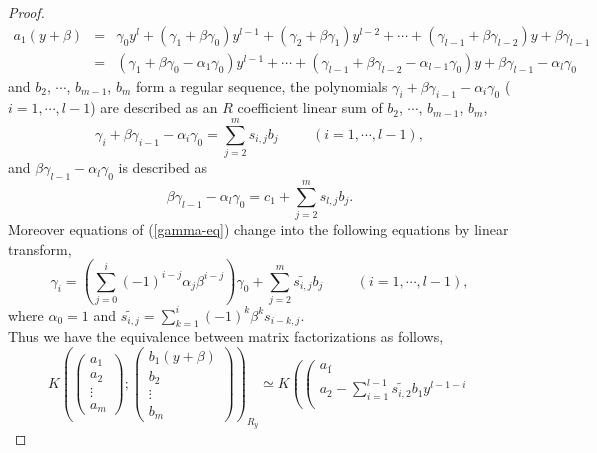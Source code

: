 \documentclass[10pt]{amsart}
\theoremstyle{break}
\begin{document}
\begin{proof}
\begin{eqnarray*}
a_1(y+\beta)&=&\gamma_{0}y^{l}+(\gamma_{1}+\beta\gamma_{0})y^{l-1}+(\gamma_{2}+\beta\gamma_{1})y^{l-2}+\cdots +(\gamma_{l-1}+\beta\gamma_{l-2})y+\beta\gamma_{l-1}\\[-0.1em]
&=&(\gamma_{1}+\beta\gamma_{0}-\alpha_1\gamma_{0})y^{l-1}+\cdots +(\gamma_{l-1}+\beta\gamma_{l-2}-\alpha_{l-1}\gamma_{0})y+\beta\gamma_{l-1}-\alpha_l\gamma_{0}
\end{eqnarray*}
and $b_2$, $\cdots$, $b_{m-1}$, $b_{m}$ form a regular sequence, the polynomials $\gamma_{i}+\beta\gamma_{i-1}-\alpha_{i}\gamma_{0}$ ($i=1,\cdots ,l-1$) are described as an $R$ coefficient linear sum of $b_2$, $\cdots$, $b_{m-1}$, $b_m$,
\begin{equation}\label{gamma-eq}
\gamma_{i}+\beta\gamma_{i-1}-\alpha_{i}\gamma_{0}=\sum_{j=2}^{m}s_{i,j}b_j \hspace{1cm}(i=1,\cdots ,l-1),
\end{equation}
and $\beta\gamma_{l-1}-\alpha_l\gamma_{0}$ is described as
\begin{equation*}
\beta\gamma_{l-1}-\alpha_l\gamma_{0}=c_1+\sum_{j=2}^{m}s_{l,j}b_j.
\end{equation*}
Moreover equations of (\ref{gamma-eq}) change into the following equations by linear transform,
\begin{equation*}
\gamma_i=(\sum_{j=0}^{i}(-1)^{i-j}\alpha_j\beta^{i-j})\gamma_0+\sum_{j=2}^{m}\widetilde{s_{i,j}}b_j\hspace{1cm}(i=1,\cdots ,l-1),
\end{equation*}
where $\alpha_0=1$ and $\displaystyle\widetilde{s_{i,j}}= \sum_{k=1}^{i}(-1)^k\beta^k s_{i-k,j}$.\\
Thus we have the equivalence between matrix factorizations as follows,
\begin{equation*}
K\left(\left(
\begin{array}{c}
a_1\\
a_2\\
\vdots\\
a_m
\end{array}
\right);
\left(
\begin{array}{c}
b_1(y+\beta)\\
b_2\\
\vdots\\
b_m
\end{array}
\right)\right)_{R_y}
\simeq
K\left(\left(
\begin{array}{c}
a_1\acute{}\\
a_2-\sum_{i=1}^{l-1}\widetilde{s_{i,2}}b_1y^{l-1-i}\\

\end{array}
\end{equation*}
\end{proof}
\end{document}
